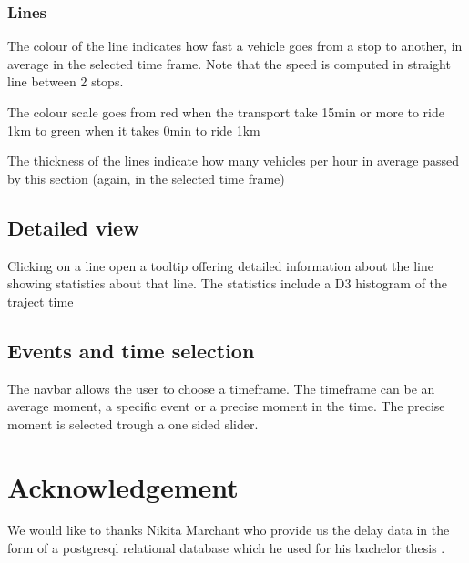\documentclass[11pt]{article}%
\begin{document}
\subsubsection{Lines}
The colour of the line indicates how fast a vehicle goes from a stop to another, in average in the selected time frame. Note that the speed is computed in straight line between 2 stops.

The colour scale goes from red when the transport take 15min or more to ride 1km to green when it takes 0min to ride 1km

The thickness of the lines indicate how many vehicles per hour in average passed by this section (again, in the selected time frame)


\subsection{Detailed view}



Clicking on a line open a tooltip offering detailed information about the line showing statistics about that line. The statistics include a D3 histogram of the traject time



\subsection{Events and time selection}

The navbar allows the user to choose a timeframe. The timeframe can be an average moment, a specific event or a precise moment in the time. The precise moment is selected trough a one sided slider.

\section{Acknowledgement}

We would like to thanks Nikita Marchant who provide us the delay data in the form of a postgresql relational database which he used for his bachelor thesis \cite{nikita}. 
\end{document}
